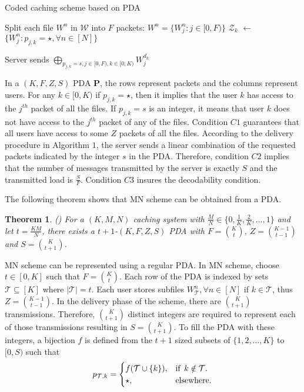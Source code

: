 \documentclass[conference,a4paper,10pt]{IEEEtran}
\newtheorem{thm}{Theorem}
\begin{document}
\begin{algorithm}
	\renewcommand{\thealgorithm}{1}
	\caption{Coded caching scheme based on PDA \cite{YCT}}
	\begin{algorithmic}[1]
		\State Split each file $W^n$ in $\mathcal{W}$ into $F$ packets: $W^n =\{W^n_j: j \in [0,F)\}$
		\State  $\mathcal{Z}_k$ $\leftarrow$ $\{W^n_{j}: p_{j,k}=\star, \forall n \in [N]\}$
		\EndFor
		\EndProcedure
		
		\State Server sends $\underset{p_{j,k}=s, j\in [0,F),k\in[0,K)}{\bigoplus}W^{d_k}_j$
		\EndFor    
		\EndProcedure
	\end{algorithmic}
\end{algorithm}

In a $(K,F,Z,S)$ PDA $\mathbf{P}$, the rows represent packets and the columns represent users. For any $k \in [0,K)$ if $p_{j,k}=\star$, then it implies that the user $k$ has access to the $j^{th}$ packet of all the files. If $p_{j,k}=s$ is an integer, it means that user $k$ does not have access to the $j^{th}$ packet of any of the files. Condition $C1$ guarantees that all users have access to some $Z$ packets of all the files. According to the delivery procedure in Algorithm $1$, the server sends a linear combination of the requested packets indicated by the integer $s$ in the PDA. Therefore, condition $C2$ implies that the number of messages transmitted by the server is exactly $S$ and the transmitted load is $\frac{S}{F}$. Condition $C3$ insures the decodability condition.

The following theorem shows that MN scheme can be obtained from a PDA.
\begin{thm}
	(\cite{YCT}) For a $(K,M,N)$ caching system with $\frac{M}{N} \in \{0, \frac{1}{K}, \frac{2}{K}, \ldots, 1 \}$ and let $t=\frac{KM}{N}$, there exists a $t+1$-$(K,F,Z,S)$ PDA with $F=\binom{K}{t}$, $Z=\binom{K-1}{t-1}$ and $S=\binom{K}{t+1}$.
\end{thm}

MN scheme can be represented using a regular PDA. In MN scheme, choose $t \in [0,K]$ such that $F = \binom{K}{t}$. Each row of the PDA is indexed by sets $\mathcal{T} \subseteq [K]$ where $|\mathcal{T}|=t$. Each user stores subfiles $W^{n}_{\mathcal{T}}, \forall n \in [N]$ if $k \in \mathcal{T}$, thus $Z=\binom{K-1}{t-1}$. In the delivery phase of the scheme, there are $\binom{K}{t+1}$ transmissions. Therefore, $\binom{K}{t+1}$ distinct integers are required to represent each of those transmissions resulting in $S = \binom{K}{t+1}$. To fill the PDA with these integers, a bijection $f$  is defined from the $t+1$ sized subsets of $\{1,2,\ldots,K\}$ to $[0,S)$ such that 
\begin{equation}
p_{\mathcal{T},k} = 
\begin{cases}
f(\mathcal{T}\cup \{k\}), & \textrm{if \hspace{0.05cm}} k \notin \mathcal{T}.\\
\star, & \textrm{elsewhere}.
\end{cases}
\label{pda}
\end{equation}
\end{document}
